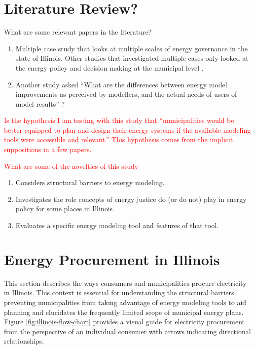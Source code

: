 \section{Literature Review?}

What are some relevant papers in the literature?
\begin{enumerate}
    \item Multiple case study that looks at multiple scales of energy governance
    in the state of Illinois. Other studies that investigated multiple cases
    only looked at the energy policy and decision making at the municipal level
    \cite{johannsen_designing_2021, ben_amer_too_2020}.
    \item Another study asked ``What are the differences between energy model
    improvements as perceived by modellers, and the actual needs of users of
    model results'' \cite{susser_better_2022}?
\end{enumerate}

\textcolor{red}{Is the hypothesis I am testing with this study that
``municipalities would be better equipped to plan and design their energy
systems if the available modeling tools were accessible and relevant.'' This
hypothesis comes from the implicit suppositions in a few papers. }

\textcolor{red}{What are some of the novelties of this study}
\begin{enumerate}
    \item Considers structural barriers to energy modeling.
    \item Investigates the role concepts of energy justice do (or do not) play
    in energy policy for some places in Illinois.
    \item Evaluates a specific energy modeling tool and features of that tool.
\end{enumerate}

\section{Energy Procurement in Illinois}

This section describes the ways consumers and municipalities procure electricity
in Illinois. This context is essential for understanding the structural barriers
preventing municipalities from taking advantage of energy modeling tools to aid
planning and elucidates the frequently limited scope of municipal energy plans.
Figure \ref{fig:illinois-flow-chart} provides a visual guide for electricity
procurement from the perspective of an individual consumer with arrows
indicating directional relationships.

